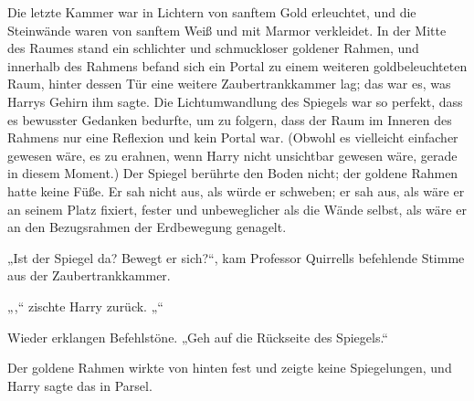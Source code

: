 Die letzte Kammer war in Lichtern von sanftem Gold erleuchtet, und die Steinwände waren von sanftem Weiß und mit Marmor verkleidet.
In der Mitte des Raumes stand ein schlichter und schmuckloser goldener Rahmen, und innerhalb des Rahmens befand sich ein Portal zu einem weiteren goldbeleuchteten Raum, hinter dessen Tür eine weitere Zaubertrankkammer lag; das war es, was Harrys Gehirn ihm sagte. Die Lichtumwandlung des Spiegels war so perfekt, dass es bewusster Gedanken bedurfte, um zu folgern, dass der Raum im Inneren des Rahmens nur eine Reflexion und kein Portal war. (Obwohl es vielleicht einfacher gewesen wäre, es zu erahnen, wenn Harry nicht unsichtbar gewesen wäre, gerade in diesem Moment.)
Der Spiegel berührte den Boden nicht; der goldene Rahmen hatte keine Füße. Er sah nicht aus, als würde er schweben; er sah aus, als wäre er an seinem Platz fixiert, fester und unbeweglicher als die Wände selbst, als wäre er an den Bezugsrahmen der Erdbewegung genagelt.

„Ist der Spiegel da? Bewegt er sich?“, kam Professor Quirrells befehlende Stimme aus der Zaubertrankkammer.

„,“ zischte Harry zurück. „“

Wieder erklangen Befehlstöne. „Geh auf die Rückseite des Spiegels.“

Der goldene Rahmen wirkte von hinten fest und zeigte keine Spiegelungen, und Harry sagte das in Parsel.

